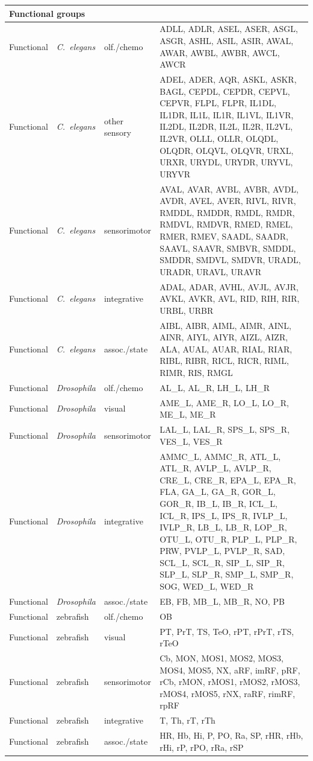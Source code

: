 \documentclass[9pt,twoside]{pnas-new}
\begin{document}
\begin{table}[!ht]
\begin{tabularx}{\linewidth}{lllX}
\midrule
\multicolumn{4}{l}{\textbf{Functional groups}} \\
\midrule
Functional & \textit{C.~elegans} & olf./chemo & ADLL, ADLR, ASEL, ASER, ASGL, ASGR, ASHL, ASIL, ASIR, AWAL, AWAR, AWBL, AWBR, AWCL, AWCR \\
Functional & \textit{C.~elegans} & other sensory & ADEL, ADER, AQR, ASKL, ASKR, BAGL, CEPDL, CEPDR, CEPVL, CEPVR, FLPL, FLPR, IL1DL, IL1DR, IL1L, IL1R, IL1VL, IL1VR, IL2DL, IL2DR, IL2L, IL2R, IL2VL, IL2VR, OLLL, OLLR, OLQDL, OLQDR, OLQVL, OLQVR, URXL, URXR, URYDL, URYDR, URYVL, URYVR \\
Functional & \textit{C.~elegans} & sensorimotor & AVAL, AVAR, AVBL, AVBR, AVDL, AVDR, AVEL, AVER, RIVL, RIVR, RMDDL, RMDDR, RMDL, RMDR, RMDVL, RMDVR, RMED, RMEL, RMER, RMEV, SAADL, SAADR, SAAVL, SAAVR, SMBVR, SMDDL, SMDDR, SMDVL, SMDVR, URADL, URADR, URAVL, URAVR \\
Functional & \textit{C.~elegans} & integrative & ADAL, ADAR, AVHL, AVJL, AVJR, AVKL, AVKR, AVL, RID, RIH, RIR, URBL, URBR \\
Functional & \textit{C.~elegans} & assoc./state & AIBL, AIBR, AIML, AIMR, AINL, AINR, AIYL, AIYR, AIZL, AIZR, ALA, AUAL, AUAR, RIAL, RIAR, RIBL, RIBR, RICL, RICR, RIML, RIMR, RIS, RMGL \\

Functional & \textit{Drosophila} & olf./chemo & AL\_L, AL\_R, LH\_L, LH\_R \\
Functional & \textit{Drosophila} & visual & AME\_L, AME\_R, LO\_L, LO\_R, ME\_L, ME\_R \\
Functional & \textit{Drosophila} & sensorimotor & LAL\_L, LAL\_R, SPS\_L, SPS\_R, VES\_L, VES\_R \\
Functional & \textit{Drosophila} & integrative & AMMC\_L, AMMC\_R, ATL\_L, ATL\_R, AVLP\_L, AVLP\_R, CRE\_L, CRE\_R, EPA\_L, EPA\_R, FLA, GA\_L, GA\_R, GOR\_L, GOR\_R, IB\_L, IB\_R, ICL\_L, ICL\_R, IPS\_L, IPS\_R, IVLP\_L, IVLP\_R, LB\_L, LB\_R, LOP\_R, OTU\_L, OTU\_R, PLP\_L, PLP\_R, PRW, PVLP\_L, PVLP\_R, SAD, SCL\_L, SCL\_R, SIP\_L, SIP\_R, SLP\_L, SLP\_R, SMP\_L, SMP\_R, SOG, WED\_L, WED\_R \\
Functional & \textit{Drosophila} & assoc./state & EB, FB, MB\_L, MB\_R, NO, PB \\

Functional & zebrafish & olf./chemo & OB \\
Functional & zebrafish & visual & PT, PrT, TS, TeO, rPT, rPrT, rTS, rTeO \\
Functional & zebrafish & sensorimotor & Cb, MON, MOS1, MOS2, MOS3, MOS4, MOS5, NX, aRF, imRF, pRF, rCb, rMON, rMOS1, rMOS2, rMOS3, rMOS4, rMOS5, rNX, raRF, rimRF, rpRF \\
Functional & zebrafish & integrative & T, Th, rT, rTh \\
Functional & zebrafish & assoc./state & HR, Hb, Hi, P, PO, Ra, SP, rHR, rHb, rHi, rP, rPO, rRa, rSP \\
\bottomrule
\end{tabularx}
\end{table}
\end{document}
